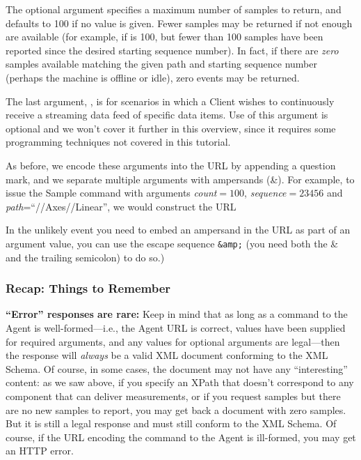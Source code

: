 The optional  argument specifies a maximum number of samples to
return, and defaults to 100 if no value is given.  Fewer samples may be
returned if not enough are available (for example, 
if  is 100, but fewer than 100 samples have been
reported since the desired starting sequence number).  In fact, if there
are \emph{zero} samples available matching the given path and
starting sequence number (perhaps the machine is offline or idle), zero
events may be returned.

The last argument, , is for
scenarios in which a Client wishes to continuously receive a streaming
data feed of specific data items.  Use of this argument is optional
and we won't cover it further in this
overview, since it requires some programming techniques not covered in
this tutorial.

As before, we encode these arguments into the URL by appending a
question mark, and we separate multiple arguments with ampersands (\&).
For example, to issue the Sample command with arguments
\emph{count$=100$}, \emph{sequence$=23456$} and
\emph{path}=``//Axes//Linear'', we would construct  the URL

\begin{quotation}
\end{quotation}

In the unlikely event you need to embed an ampersand in the URL as
part of an argument value, you can
use the escape sequence \verb+&amp;+ (you need both the \& and the
trailing semicolon) to do so.)

\subsubsection{Recap: Things to Remember}

\textbf{``Error'' responses are rare:}
Keep in mind that as long as a command to the Agent is
well-formed---i.e., the Agent URL is correct, values have been supplied
for required arguments, and any values for optional arguments are
legal---then the response will \emph{always} be a valid XML document
conforming to the \mtc{} XML Schema.  Of course, in some cases, the
document may not have any ``interesting'' content: as we saw above, if
you specify an XPath that doesn't correspond to any component that can
deliver measurements, or if you request samples but there are no new
samples to report, you may get back a document with zero samples.  But
it is still a legal response and must still conform to the \mtc{} XML
Schema.  Of course, if the URL encoding the command to the Agent is
ill-formed, you  may get an HTTP error.

